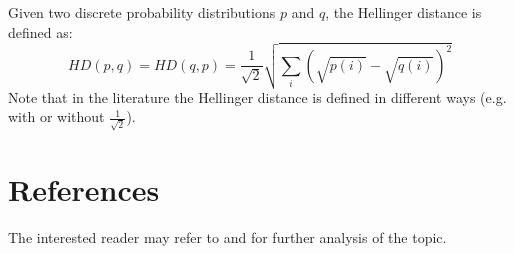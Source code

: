 Given two discrete probability distributions $p$ and $q$, the Hellinger distance is defined as:
$$\mathit{HD}(p, q) = \mathit{HD}(q, p) = \frac{1}{\sqrt{2}} \sqrt{\sum_i (\sqrt{p(i)} - \sqrt{q(i)})^2}$$
Note that in the literature the Hellinger distance is defined in different ways (e.g. with or without $\frac{1}{\sqrt{2}}$).

\section{References}
The interested reader may refer to \cite{Joyce2011} and \cite{Hellinger1909} for further analysis of the topic.